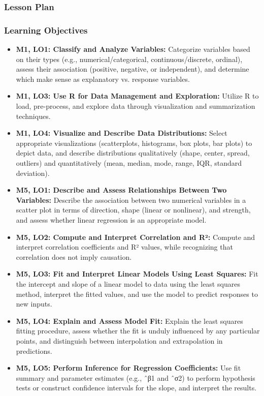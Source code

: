 \begin{frame}
    \frametitle{Lesson Plan}
    \begin{itemize}
    \end{itemize}
\end{frame}

\begin{frame}
    \frametitle{Learning Objectives}
    \begin{itemize}
        \item \textbf{M1, LO1: Classify and Analyze Variables:} Categorize variables based on their types (e.g., numerical/categorical, continuous/discrete, ordinal), assess their association (positive, negative, or independent), and determine which make sense as explanatory vs. response variables.
        \item \textbf{M1, LO3: Use R for Data Management and Exploration:} Utilize R to load, pre-process, and explore data through visualization and summarization techniques.
        \item \textbf{M1, LO4: Visualize and Describe Data Distributions:} Select appropriate visualizations (scatterplots, histograms, box plots, bar plots) to depict data, and describe distributions qualitatively (shape, center, spread, outliers) and quantitatively (mean, median, mode, range, IQR, standard deviation).
        \item \textbf{M5, LO1: Describe and Assess Relationships Between Two Variables:} Describe the association between two numerical variables in a scatter plot in terms of direction, shape (linear or nonlinear), and strength, and assess whether linear regression is an appropriate model.    
        \item \textbf{M5, LO2: Compute and Interpret Correlation and R²:} Compute and interpret correlation coefficients and R² values, while recognizing that correlation does not imply causation. 
        \item \textbf{M5, LO3: Fit and Interpret Linear Models Using Least Squares:} Fit the intercept and slope of a linear model to data using the least squares method, interpret the fitted values, and use the model to predict responses to new inputs.
        \item \textbf{M5, LO4: Explain and Assess Model Fit:} Explain the least squares fitting procedure, assess whether the fit is unduly influenced by any particular points, and distinguish between interpolation and extrapolation in predictions.
        \item \textbf{M5, LO5: Perform Inference for Regression Coefficients:} Use fit summary and parameter estimates (e.g., ˆβ1 and ˆσ2) to perform hypothesis tests or construct confidence intervals for the slope, and interpret the results.
    \end{itemize}
\end{frame}
    

